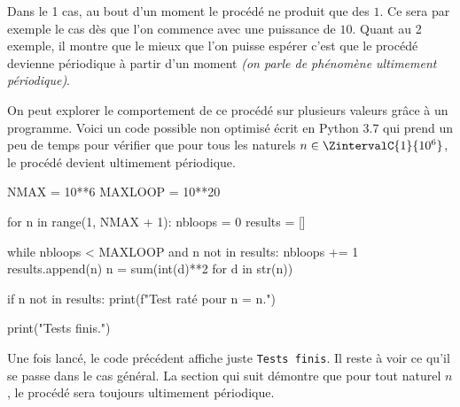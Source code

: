 Dans le 1\ier{} cas, au bout d'un moment le procédé ne produit que des $1$. Ce sera par exemple le cas dès que l'on commence avec une puissance de $10$.
Quant au 2\ieme{} exemple, il montre que le mieux que l'on puisse espérer c'est que le procédé devienne périodique à partir d'un moment \emph{(on parle de phénomène ultimement périodique)}.


\medskip

On peut explorer le comportement de ce procédé sur plusieurs valeurs grâce à un programme. Voici un code possible non optimisé écrit en Python 3.7 qui prend un peu de temps pour vérifier que pour tous les naturels $n \in \ZintervalC{1}{10^6}$, le procédé devient ultimement périodique.

\begin{rawcode}
NMAX    = 10**6
MAXLOOP = 10**20

for n in range(1, NMAX + 1):
    nbloops = 0
    results = []

    while nbloops < MAXLOOP and n not in results:
        nbloops += 1
        results.append(n)
        n = sum(int(d)**2 for d in str(n))

    if n not in results:
        print(f"Test raté pour n = {n}.")

print("Tests finis.")
\end{rawcode}

\medskip

Une fois lancé, le code précédent affiche juste \verb+Tests finis+.
Il reste à voir ce qu'il se passe dans le cas général. La section qui suit démontre que pour tout naturel $n$, le procédé sera toujours ultimement périodique.

